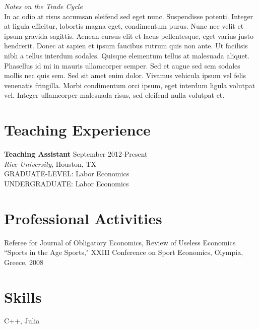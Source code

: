 \documentclass[11pt]{res} %
\newcommand{\forceindent}{\leavevmode{\parindent=24pt\indent}}
\begin{document}
\begin{resume}
\vspace{6pt} %

\emph{Notes on the Trade Cycle}      \hfill   \\
In ac odio at risus accumsan eleifend sed eget nunc. Suspendisse potenti. Integer at ligula efficitur, lobortis magna eget, condimentum purus. Nunc nec velit et ipsum gravida sagittis. Aenean cursus elit et lacus pellentesque, eget varius justo hendrerit. Donec at sapien et ipsum faucibus rutrum quis non ante. Ut facilisis nibh a tellus interdum sodales. Quisque elementum tellus at malesuada aliquet. Phasellus id mi in mauris ullamcorper semper. Sed et augue sed sem sodales mollis nec quis sem. Sed sit amet enim dolor. Vivamus vehicula ipsum vel felis venenatis fringilla. Morbi condimentum orci ipsum, eget interdum ligula volutpat vel. Integer ullamcorper malesuada risus, sed eleifend nulla volutpat et. 

\section{Teaching Experience}
\vspace{6pt}%

\textbf{Teaching Assistant} \hfill     September 2012-Present \\
\forceindent \emph{Rice University}, Houston, TX              \\
\forceindent GRADUATE-LEVEL: Labor Economics                  \\
\forceindent UNDERGRADUATE: Labor Economics

\section{Professional Activities}
\vspace{6pt}%

Referee for Journal of Obligatory Economics, Review of Useless Economics \\
``Sports in the Age Sports," XXIII Conference on Sport Economics, Olympia, Greece, 2008

\section{Skills}
\vspace{6pt}%

C++, Julia

\end{resume}
\end{document}
